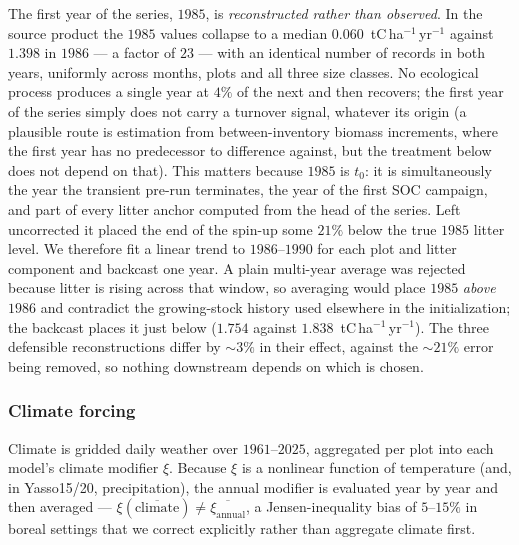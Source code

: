 \documentclass[11pt]{article}
\begin{document}
The first year of the series, $1985$, is \emph{reconstructed rather than observed}. In the
source product the $1985$ values collapse to a median $0.060$~tC\,ha$^{-1}$\,yr$^{-1}$
against $1.398$ in $1986$ --- a factor of $23$ --- with an identical number of records in
both years, uniformly across months, plots and all three size classes. No ecological process
produces a single year at $4\%$ of the next and then recovers; the first year of the series
simply does not carry a turnover signal, whatever its origin (a plausible route is estimation
from between-inventory biomass increments, where the first year has no predecessor to
difference against, but the treatment below does not depend on that). This matters because $1985$ is $t_0$: it is
simultaneously the year the transient pre-run terminates, the year of the first SOC
campaign, and part of every litter anchor computed from the head of the series. Left
uncorrected it placed the end of the spin-up some $21\%$ below the true $1985$ litter
level. We therefore fit a linear trend to $1986$--$1990$ for each plot and litter
component and backcast one year. A plain multi-year average was rejected because litter is
rising across that window, so averaging would place $1985$ \emph{above} $1986$ and
contradict the growing-stock history used elsewhere in the initialization; the backcast
places it just below ($1.754$ against $1.838$~tC\,ha$^{-1}$\,yr$^{-1}$). The three
defensible reconstructions differ by $\sim\!3\%$ in their effect, against the $\sim\!21\%$
error being removed, so nothing downstream depends on which is chosen.

\subsubsection{Climate forcing}
Climate is gridded daily weather over $1961$--$2025$, aggregated per plot into
each model's climate modifier $\xi$. Because $\xi$ is a nonlinear function of
temperature (and, in Yasso15/20, precipitation), the annual modifier is
evaluated year by year and then averaged --- $\xi(\overline{\text{climate}})
\neq \overline{\xi_{\text{annual}}}$, a Jensen-inequality bias of $5$--$15\%$ in
boreal settings that we correct explicitly rather than aggregate climate first.
\end{document}
